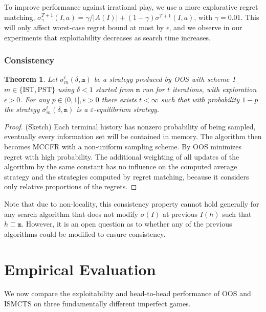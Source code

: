 \documentclass{aamas2015}
\newcommand{\ttm}{\mathtt{m}}
\newtheorem{theorem}{Theorem}
\begin{document}
To improve performance against irrational play, we use a more explorative regret matching, 
$\sigma^{T+1}_\gamma(I,a) = \gamma/|A(I)| + (1-\gamma) \sigma^{T+1}(I,a)$, with $\gamma = 0.01$. 
This will only affect worst-case regret bound at most by $\epsilon$, and we observe 
in our experiments that exploitability decreases as search time increases. 


\subsubsection{Consistency}

\begin{theorem}
Let $\bar{\sigma}^t_m(\delta,\ttm)$ be a strategy produced by OOS with scheme 1$m \in \{ \mbox{IST}, \mbox{PST} \}$ 
using $\delta < 1$ started from $\ttm$ run for $t$ iterations, with exploration $\epsilon > 0$.  
For any $p \in (0, 1], \varepsilon > 0$ there exists $t < \infty$ such that with 
probability $1-p$ the strategy  $\bar{\sigma}^t_m(\delta,\ttm)$ is a $\varepsilon$-equilibrium strategy. 
\label{thm:consistency}
\end{theorem}
\begin{proof}(Sketch) Each terminal history has nonzero probability of being sampled, eventually every information 
set will be contained in memory. The algorithm then becomes MCCFR with a non-uniform sampling scheme.
By \cite[Theorem 5]{Lanctot09Sampling} OOS minimizes regret with high probability. The additional weighting of all updates of the algorithm by the same constant has no influence on the computed average strategy and the strategies computed by regret matching, because it considers only relative proportions of the regrets.
\end{proof}

Note that due to non-locality, this consistency property cannot hold generally for any search 
algorithm that does not modify $\sigma(I)$ at previous $I(h)$ such that $h \sqsubset \ttm$. However, 
it is an open question as to whether any of the previous algorithms could be modified to ensure 
consistency.

\section{Empirical Evaluation}

We now compare the exploitability  and head-to-head performance
of OOS and ISMCTS on three fundamentally different imperfect games. %
\end{document}
